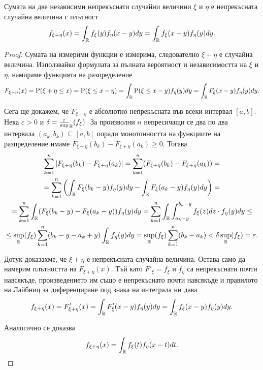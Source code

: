 \documentclass[numbers=endperiod, DIV=15, bibliography=totocnumbered]{scrartcl}
\begin{document}
\begin{proposition}\label{thm:convolution}
  Сумата на две независими непрекъснати случайни величини $\xi$ и $\eta$ е непрекъсната случайна величина с плътност
  \begin{displaymath}
    f_{\xi + \eta} (x)
    =
    \int_{\mathbb{R}} f_\xi(y) f_\eta(x - y) dy
    =
    \int_{\mathbb{R}} f_\xi(x - y) f_\eta(y) dy.
  \end{displaymath}
\end{proposition}
\begin{proof} Сумата на измерими функции е измерима, следователно $\xi + \eta$ е случайна величина. Използвайки формулата за пълната вероятност и независимостта на $\xi$ и $\eta$, намираме функцията на разпределение
  \begin{displaymath}
    F_{\xi + \eta} (x)
    =
    \operatorname{P}(\xi + \eta \leq x)
    =
    \operatorname{P}(\xi \leq x - \eta)
    =
    \int_{\mathbb{R}} \operatorname{P}(\xi \leq x - y) f_\eta(y) dy
    =
    \int_{\mathbb{R}} F_\xi(x - y) f_\eta(y) dy.
  \end{displaymath}

  Сега ще докажем, че $F_{\xi + \eta}$ е абсолютно непрекъсната във всеки интервал $[a, b]$. Нека $\varepsilon > 0$ и $\delta = \frac \varepsilon \sup_{\mathbb{R}}(f_\xi)$. За произволни $n$ непресичащи се два по два интервала $(a_k, b_k) \subseteq [a, b]$ поради монотонността на функциите на разпределение имаме $F_{\xi+\eta} (b_k) - F_{\xi+\eta}(a_k) \geq 0$. Тогава
  \begin{multline*}
    \sum_{k=1}^n \left\vert F_{\xi+\eta} (b_k) - F_{\xi+\eta}(a_k) \right\vert
    =
    \sum_{k=1}^n (F_{\xi+\eta} (b_k) - F_{\xi+\eta}(a_k))
    = \\ =
    \sum_{k=1}^n \left(\int_{\mathbb{R}} F_\xi(b_k - y) f_\eta(y) dy - \int_{\mathbb{R}} F_\xi(a_k - y) f_\eta(y) dy \right)
    = \\ =
    \sum_{k=1}^n \int_{\mathbb{R}} (F_\xi(b_k - y) - F_\xi(a_k - y)) f_\eta(y) dy
    =
    \sum_{k=1}^n \int_{\mathbb{R}} \int_{a_k - y}^{b_k - y} f_\xi(z) dz \cdot f_\eta(y) dy
    \leq \\ \leq
    \sup_{\mathbb{R}}(f_\xi) \sum_{k=1}^n (b_k - y - a_k + y) \int_{\mathbb{R}} f_\eta(y) dy
    =
    \sup_{\mathbb{R}}(f_\xi) \sum_{k=1}^n (b_k - a_k)
    <
    \delta \sup_{\mathbb{R}}(f_\xi)
    =
    \varepsilon.
  \end{multline*}

  Дотук доказахме, че $\xi + \eta$ е непрекъсната случайна величина. Остава само да намерим плътността на $F_{\xi + \eta}(x)$. Тъй като $F'_\xi = f_\xi$ и $f_\eta$ са непрекъснати почти навсякъде, произведението им също е непрекъснато почти навсякъде и правилото на Лайбниц за диференциране под знака на интеграла ни дава
  \begin{displaymath}
    f_{\xi + \eta} (x)
    =
    F'_{\xi + \eta} (x)
    =
    \int_{\mathbb{R}} F'_\xi(x - y) f_\eta(y) dy
    =
    \int_{\mathbb{R}} f_\xi(x - y) f_\eta(y) dy.
  \end{displaymath}

  Аналогично се доказва
  \begin{displaymath}
    f_{\xi + \eta} (x)
    =
    \int_{\mathbb{R}} f_\xi(t) f_\eta(x - t) dt.
  \end{displaymath}
\end{proof}
\end{document}
